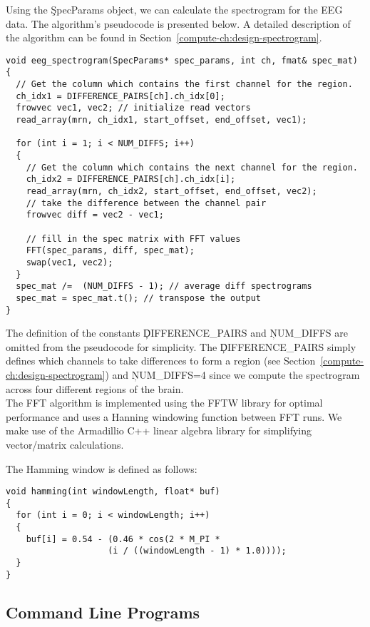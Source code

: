 Using the \c{SpecParams} object, we can calculate the spectrogram for the EEG
data. The algorithm's pseudocode is presented below. A detailed description of
the algorithm can be found in Section~\ref{compute-ch:design-spectrogram}.

\begin{lstlisting}
void eeg_spectrogram(SpecParams* spec_params, int ch, fmat& spec_mat)
{
  // Get the column which contains the first channel for the region.
  ch_idx1 = DIFFERENCE_PAIRS[ch].ch_idx[0];
  frowvec vec1, vec2; // initialize read vectors
  read_array(mrn, ch_idx1, start_offset, end_offset, vec1);

  for (int i = 1; i < NUM_DIFFS; i++)
  {
    // Get the column which contains the next channel for the region.
    ch_idx2 = DIFFERENCE_PAIRS[ch].ch_idx[i];
    read_array(mrn, ch_idx2, start_offset, end_offset, vec2);
    // take the difference between the channel pair
    frowvec diff = vec2 - vec1;

    // fill in the spec matrix with FFT values
    FFT(spec_params, diff, spec_mat);
    swap(vec1, vec2);
  }
  spec_mat /=  (NUM_DIFFS - 1); // average diff spectrograms
  spec_mat = spec_mat.t(); // transpose the output
}
\end{lstlisting}

The definition of the constants \c{DIFFERENCE\_PAIRS} and \c{NUM\_DIFFS} are
omitted from the pseudocode for simplicity. The \c{DIFFERENCE\_PAIRS} simply
defines which channels to take differences to form a region (see
Section~\ref{compute-ch:design-spectrogram}) and \c{NUM\_DIFFS=4} since we
compute the spectrogram across four different regions of the brain. \\

The FFT algorithm is implemented using the FFTW library \cite{fftw} for optimal
performance and uses a Hanning windowing function between FFT runs. We make use
of the Armadillio C++ linear algebra library \cite{arma} for simplifying
vector/matrix calculations.

The Hamming window is defined as follows:

\begin{lstlisting}
void hamming(int windowLength, float* buf)
{
  for (int i = 0; i < windowLength; i++)
  {
    buf[i] = 0.54 - (0.46 * cos(2 * M_PI *
                    (i / ((windowLength - 1) * 1.0))));
  }
}
\end{lstlisting}

\subsection{Command Line Programs}\label{compute-ch:implementation-cmd}

